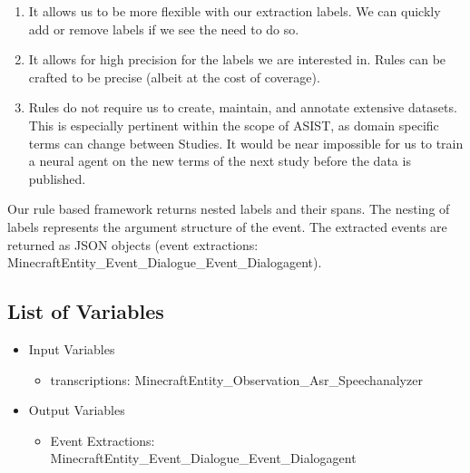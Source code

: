 \begin{enumerate}

 \item It allows us to be more flexible with our extraction labels. We can
     quickly add or remove labels if we see the need to do so.

 \item It allows for high precision for the labels we are interested in. Rules
     can be crafted to be precise (albeit at the cost of coverage).

 \item Rules do not require us to create, maintain, and annotate extensive
     datasets. This is especially pertinent within the scope of ASIST, as
     domain specific terms can change between Studies. It would be near
     impossible for us to train a neural agent on the new terms of the next
     study before the data is published.

\end{enumerate}

Our rule based framework returns nested labels and their spans. The nesting of
labels represents the argument structure of the event. The extracted events are
returned as JSON objects (event extractions:
MinecraftEntity\_Event\_Dialogue\_Event\_Dialogagent). 


\subsection{List of Variables}
\begin{itemize}
    \item Input Variables
    \begin{itemize}
        \item transcriptions: MinecraftEntity\_Observation\_Asr\_Speechanalyzer
    \end{itemize}
    \item Output Variables
    \begin{itemize}
        \item Event Extractions: MinecraftEntity\_Event\_Dialogue\_Event\_Dialogagent
    \end{itemize}
\end{itemize}


